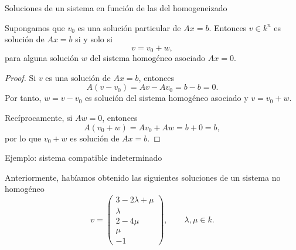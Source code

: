 \begin{frame}{Soluciones de un sistema en función de las del homogeneizado}

\begin{proposition}
Supongamos que \(v_0\) es una solución particular de \(Ax=b\).
Entonces \(v\in k^n\) es solución de \(Ax=b\) si y solo si
\[
v=v_0+w,
\]
para alguna solución \(w\) del sistema homogéneo asociado \(Ax=0\).
\end{proposition}

\begin{proof}
Si \(v\) es una solución de \(Ax=b\), entonces
\[
A(v-v_0)=Av-Av_0=b-b=0.
\]
Por tanto, \(w=v-v_0\) es solución del sistema homogéneo asociado y
\(v=v_0+w\).

Recíprocamente, si \(Aw=0\), entonces
\[
A(v_0+w)=Av_0+Aw=b+0=b,
\]
por lo que \(v_0+w\) es solución de \(Ax=b\).
\end{proof}

\end{frame}


\begin{frame}[allowframebreaks, t]{Ejemplo: sistema compatible indeterminado}

Anteriormente, habíamos obtenido las siguientes soluciones de un sistema no homogéneo
\[
v=
\begin{pmatrix}
3-2\lambda+\mu\\
\lambda\\
2-4\mu\\
\mu\\
-1
\end{pmatrix}
,
\qquad \lambda,\mu\in k.
\]

\end{frame}

